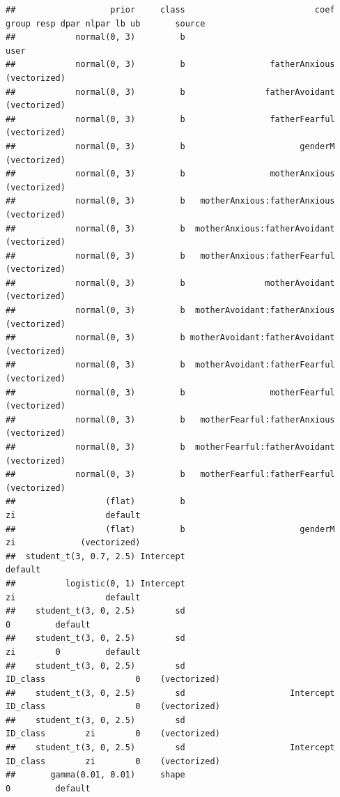 \documentclass[
]{book}
\begin{document}
\begin{verbatim}
##                   prior     class                          coef    group resp dpar nlpar lb ub       source
##            normal(0, 3)         b                                                                      user
##            normal(0, 3)         b                 fatherAnxious                                (vectorized)
##            normal(0, 3)         b                fatherAvoidant                                (vectorized)
##            normal(0, 3)         b                 fatherFearful                                (vectorized)
##            normal(0, 3)         b                       genderM                                (vectorized)
##            normal(0, 3)         b                 motherAnxious                                (vectorized)
##            normal(0, 3)         b   motherAnxious:fatherAnxious                                (vectorized)
##            normal(0, 3)         b  motherAnxious:fatherAvoidant                                (vectorized)
##            normal(0, 3)         b   motherAnxious:fatherFearful                                (vectorized)
##            normal(0, 3)         b                motherAvoidant                                (vectorized)
##            normal(0, 3)         b  motherAvoidant:fatherAnxious                                (vectorized)
##            normal(0, 3)         b motherAvoidant:fatherAvoidant                                (vectorized)
##            normal(0, 3)         b  motherAvoidant:fatherFearful                                (vectorized)
##            normal(0, 3)         b                 motherFearful                                (vectorized)
##            normal(0, 3)         b   motherFearful:fatherAnxious                                (vectorized)
##            normal(0, 3)         b  motherFearful:fatherAvoidant                                (vectorized)
##            normal(0, 3)         b   motherFearful:fatherFearful                                (vectorized)
##                  (flat)         b                                               zi                  default
##                  (flat)         b                       genderM                 zi             (vectorized)
##  student_t(3, 0.7, 2.5) Intercept                                                                   default
##          logistic(0, 1) Intercept                                               zi                  default
##    student_t(3, 0, 2.5)        sd                                                         0         default
##    student_t(3, 0, 2.5)        sd                                               zi        0         default
##    student_t(3, 0, 2.5)        sd                               ID_class                  0    (vectorized)
##    student_t(3, 0, 2.5)        sd                     Intercept ID_class                  0    (vectorized)
##    student_t(3, 0, 2.5)        sd                               ID_class        zi        0    (vectorized)
##    student_t(3, 0, 2.5)        sd                     Intercept ID_class        zi        0    (vectorized)
##       gamma(0.01, 0.01)     shape                                                         0         default
\end{verbatim}
\end{document}
